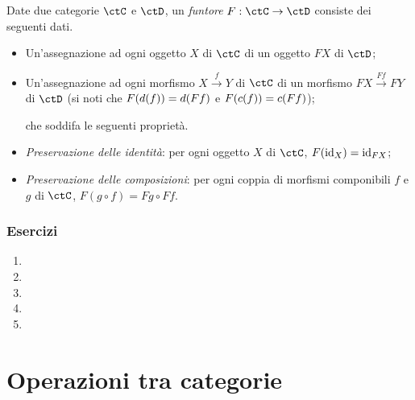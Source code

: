 
\begin{definition}
 Date due categorie $\ctC$ e $\ctD$, un \emph{funtore} $F:\ctC\to\ctD$ consiste dei seguenti dati.
 \begin{itemize}
  \item Un'assegnazione ad ogni oggetto $X$ di $\ctC$ di un oggetto $FX$ di $\ctD$;
  \item Un'assegnazione ad ogni morfismo $X \xrightarrow{f} Y$ di $\ctC$ di un morfismo $FX \xrightarrow{Ff} FY$ di $\ctD$ (si noti che $F(d(f))=d(Ff)$ e $F(c(f))=c(Ff)$);

  che soddifa le seguenti proprietà.
  \item \emph{Preservazione delle identità}: per ogni oggetto $X$ di $\ctC$, $F(\mathrm{id}_X)=\mathrm{id}_{FX}$;
  \item \emph{Preservazione delle composizioni}: per ogni coppia di morfismi componibili $f$ e $g$ di $\ctC$, $F(g\circ f)=Fg\circ Ff$.
 \end{itemize}
\end{definition}




\subsubsection*{Esercizi}
\begin{enumerate}
    \item
    \item
    \item
    \item
    \item
\end{enumerate}


\section{Operazioni tra categorie}


